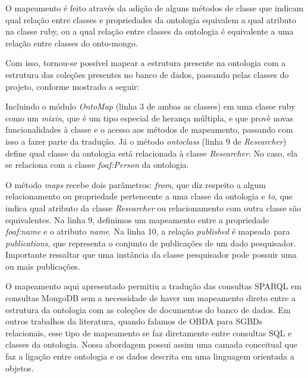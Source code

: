 O mapeamento é feito através da adição de alguns métodos de classe que indicam
qual relação entre classes e propriedades da ontologia equivalem a qual atributo
 na classe ruby, ou a qual relação entre classes da ontologia é equivalente a
 uma relação entre classes do onto-mongo.

Com isso, tornou-se possível mapear a estrutura presente na ontologia com a
estrutura das coleções presentes no banco de dados, passando pelas classes do
projeto, conforme mostrado a seguir:

% 

% 

Incluindo o módulo \textit{OntoMap} (linha 3 de ambas as classes) em uma classe
ruby como um \textit{mixin}, que é um tipo especial de herança múltipla, e que
provê novas funcionalidades à classe e o acesso aos métodos de mapeamento,
passando com isso a fazer parte da tradução. Já o método \textit{ontoclass}
(linha 9 de \textit{Researcher}) define qual classe da ontologia está
relacionada à classe \textit{Researcher}. No caso, ela se relaciona com a
classe \textit{foaf:Person} da ontologia.

O método \textit{maps} recebe dois parâmetros: \textit{from}, que diz respeito a
 algum relacionamento ou propriedade pertencente a uma classe da ontologia e
 \textit{to}, que indica qual atributo da classe \textit{Researcher} ou
 relacionamento com outra classe são equivalentes. Na linha 9, definimos um
 mapeamento entre a propriedade \textit{foaf:name} e o atributo \textit{name}.
 Na linha 10, a relação \textit{published} é mapeada para
 \textit{publications}, que representa o conjunto de publicações de um dado
 pesquisador. Importante ressaltar que uma instância da classe pesquisador
 pode possuir uma ou mais publicações.

O mapeamento aqui apresentado permitiu a tradução das consultas SPARQL em
consultas MongoDB sem a necessidade de haver um mapeamento direto entre a
estrutura da ontologia com as coleções de documentos do banco de dados. Em
outros trabalhos da literatura, quando falamos de OBDA para SGBDs relacionais,
esse tipo de mapeamento se faz diretamente entre consultas SQL e classes da
ontologia. Nossa abordagem possui assim uma camada conceitual que faz a ligação
entre ontologia e os dados descrita em uma linguagem orientada a objetos.

